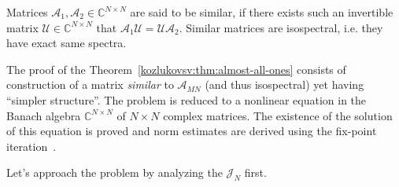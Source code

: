 Matrices \( \mathcal{A}_1, \mathcal{A}_2 \in\mathbb{C}^{N\times N} \)
    are said to be similar, if
    there exists such an invertible matrix \( \mathcal{U}\in\mathbb{C}^{N\times N} \)
    that \( \mathcal{A}_1 \mathcal{U} = \mathcal{U} \mathcal{A}_2 \).
Similar matrices are isospectral, i.e. they have exact same spectra.

The proof of the Theorem~\ref{kozlukovsv:thm:almost-all-ones} consists of construction of a matrix
    \emph{similar} to \( \mathscr{A}_{MN} \) (and thus isospectral)
    yet having ``simpler structure''.
The problem is reduced to a nonlinear equation in the Banach algebra
    \( \mathbb{C}^{N\times N} \) of \( N\times N \) complex matrices.
The existence of the solution of this equation is proved
    and norm estimates are derived using the fix-point iteration~\cite{baskakov-harmonic,baskakov1983}.

Let's approach the problem by analyzing the \( \mathcal{J}_N \) first.

